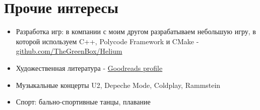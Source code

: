 \documentclass[a4paper, 11pt]{article}
\begin{document}
\section{Прочие интересы}
\begin{itemize}
    \item   Разработка игр: в компании с моим другом разрабатываем
            небольшую игру, в которой используем C++, Polycode Framework и CMake -
            \href{https://github.com/thegreenbox/helium}{github.com/TheGreenBox/Helium}
    \item   Художественная литература -
            \href{https://www.goodreads.com/user/show/29629010-sergey-nikitin}{Goodreads profile}
    \item   Музыкальные концерты U2, Depeche Mode, Coldplay, Rammstein
    \item   Спорт: бально-спортивные танцы, плавание
\end{itemize}
\end{document}
